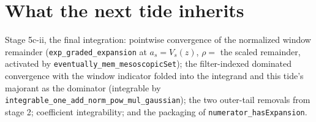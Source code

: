 \documentclass[11pt]{article}
\newcommand{\code}[1]{\texttt{#1}}
\begin{document}
\section{What the next tide inherits}

Stage 5c-ii, the final integration: pointwise convergence of the
normalized window remainder (\code{exp\_graded\_expansion} at
$a_s = V_s(z)$, $\rho = $ the scaled remainder, activated by
\code{eventually\_mem\_mesoscopicSet}); the filter-indexed dominated
convergence with the window indicator folded into the integrand and
this tide's majorant as the dominator (integrable by
\code{integrable\_one\_add\_norm\_pow\_mul\_gaussian}); the two
outer-tail removals from stage 2; coefficient integrability; and the
packaging of \code{numerator\_hasExpansion}.
\end{document}
